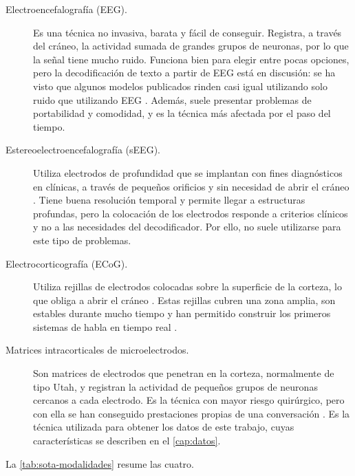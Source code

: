 \begin{description}
\item[Electroencefalografía (EEG).] Es una técnica no invasiva, barata y fácil de conseguir. Registra, a través del cráneo, la actividad sumada de grandes grupos de neuronas, por lo que la señal tiene mucho ruido. Funciona bien para elegir entre pocas opciones, pero la decodificación de texto a partir de EEG está en discusión: se ha visto que algunos modelos publicados rinden casi igual utilizando solo ruido que utilizando EEG \cite{jo2024eegtotext}. Además, suele presentar problemas de portabilidad y comodidad, y es la técnica más afectada por el paso del tiempo.
\item[Estereoelectroencefalografía (sEEG).] Utiliza electrodos de profundidad que se implantan con fines diagnósticos en clínicas, a través de pequeños orificios y sin necesidad de abrir el cráneo \cite{verwoert2022}. Tiene buena resolución temporal y permite llegar a estructuras profundas, pero la colocación de los electrodos responde a criterios clínicos y no a las necesidades del decodificador. Por ello, no suele utilizarse para este tipo de problemas.
\item[Electrocorticografía (ECoG).] Utiliza rejillas de electrodos colocadas sobre la superficie de la corteza, lo que obliga a abrir el cráneo \cite{kohler2022}. Estas rejillas cubren una zona amplia, son estables durante mucho tiempo y han permitido construir los primeros sistemas de habla en tiempo real \cite{moses2021,metzger2023}.
\item[Matrices intracorticales de microelectrodos.] Son matrices de electrodos que penetran en la corteza, normalmente de tipo Utah, y registran la actividad de pequeños grupos de neuronas cercanos a cada electrodo. Es la técnica con mayor riesgo quirúrgico, pero con ella se han conseguido prestaciones propias de una conversación \cite{willett2023,card2024}. Es la técnica utilizada para obtener los datos de este trabajo, cuyas características se describen en el \cref{cap:datos}.
\end{description}

La \cref{tab:sota-modalidades} resume las cuatro.


